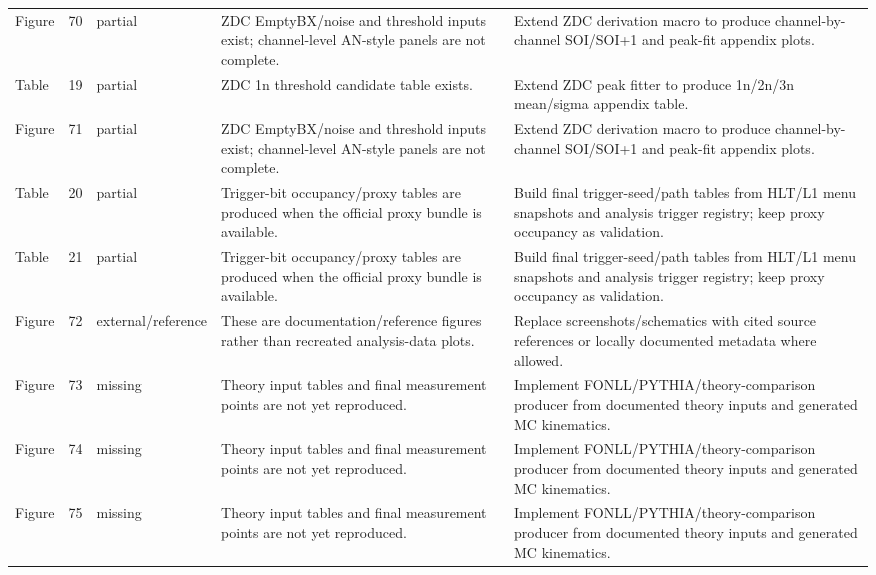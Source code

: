 \documentclass[11pt]{article}
\begin{document}
\begin{longtable}{lll p{} p{}}
Figure & 70 & partial & ZDC EmptyBX/noise and threshold inputs exist; channel-level AN-style panels are not complete. & Extend ZDC derivation macro to produce channel-by-channel SOI/SOI+1 and peak-fit appendix plots. \\
Table & 19 & partial & ZDC 1n threshold candidate table exists. & Extend ZDC peak fitter to produce 1n/2n/3n mean/sigma appendix table. \\
Figure & 71 & partial & ZDC EmptyBX/noise and threshold inputs exist; channel-level AN-style panels are not complete. & Extend ZDC derivation macro to produce channel-by-channel SOI/SOI+1 and peak-fit appendix plots. \\
Table & 20 & partial & Trigger-bit occupancy/proxy tables are produced when the official proxy bundle is available. & Build final trigger-seed/path tables from HLT/L1 menu snapshots and analysis trigger registry; keep proxy occupancy as validation. \\
Table & 21 & partial & Trigger-bit occupancy/proxy tables are produced when the official proxy bundle is available. & Build final trigger-seed/path tables from HLT/L1 menu snapshots and analysis trigger registry; keep proxy occupancy as validation. \\
Figure & 72 & external/reference & These are documentation/reference figures rather than recreated analysis-data plots. & Replace screenshots/schematics with cited source references or locally documented metadata where allowed. \\
Figure & 73 & missing & Theory input tables and final measurement points are not yet reproduced. & Implement FONLL/PYTHIA/theory-comparison producer from documented theory inputs and generated MC kinematics. \\
Figure & 74 & missing & Theory input tables and final measurement points are not yet reproduced. & Implement FONLL/PYTHIA/theory-comparison producer from documented theory inputs and generated MC kinematics. \\
Figure & 75 & missing & Theory input tables and final measurement points are not yet reproduced. & Implement FONLL/PYTHIA/theory-comparison producer from documented theory inputs and generated MC kinematics. \\
\bottomrule
\end{longtable}
\end{document}
